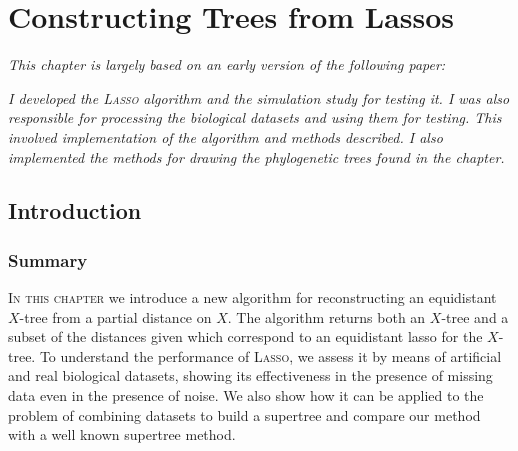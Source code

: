 \chapter{Constructing Trees from Lassos}
\label{cha:lasso-construction}

\textit{\sffamily This chapter is largely based on an early version of the
  following paper:}

\vspace{0.5em}

\noindent
{}


\begin{center}
\end{center}

\textit{\sffamily I developed the \textsc{Lasso} algorithm and the simulation
  study for testing it.  I was also responsible for processing the biological
  datasets and using them for testing.  This involved implementation of the
  algorithm and methods described.  I also implemented the methods for drawing
  the phylogenetic trees found in the chapter.}

\newpage

\section{Introduction}
\label{sec:introduction}

\subsection{Summary}

\textsc{In this chapter} we introduce a new algorithm for reconstructing an
equidistant $X$-tree from a partial distance on $X$.  The algorithm returns
both an $X$-tree and a subset of the distances given which correspond to an
equidistant lasso for the $X$-tree.  To understand the performance of
\textsc{Lasso}, we assess it by means of artificial and real biological
datasets, showing its effectiveness in the presence of missing data even in
the presence of noise.  We also show how it can be applied to the problem of
combining datasets to build a supertree and compare our method with a well
known supertree method.


